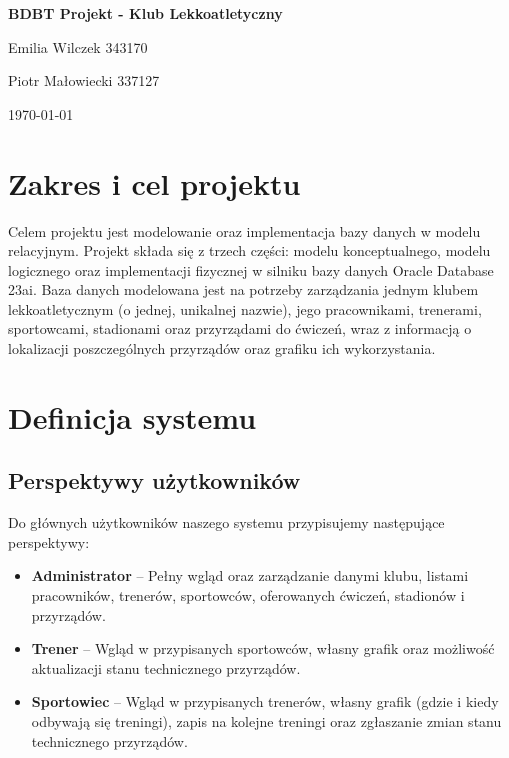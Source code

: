 \documentclass[11pt,a4paper]{article}
\newcommand{\tytulprojektu}{BDBT Projekt - Klub Lekkoatletyczny}
\newcommand{\autorzy}{Emilia Wilczek 343170\par Piotr Małowiecki 337127}
\newcommand{\dataoddania}{\today}
\begin{document}
\begin{titlepage}
    \centering

    {\LARGE\bfseries \tytulprojektu\par}
    \vspace{0.6cm}
    {\large \autorzy\par}

    \vspace{1.5cm}
    {\large \dataoddania\par}
    \vspace*{1cm}
\end{titlepage}

\tableofcontents
\clearpage

\section{Zakres i cel projektu}
Celem projektu jest modelowanie oraz implementacja bazy danych w modelu relacyjnym. Projekt składa
się z trzech części: modelu konceptualnego, modelu logicznego oraz implementacji fizycznej w
silniku bazy danych Oracle Database 23ai. Baza danych modelowana jest na potrzeby zarządzania
jednym klubem lekkoatletycznym (o jednej, unikalnej nazwie), jego pracownikami, trenerami,
sportowcami, stadionami oraz przyrządami do ćwiczeń, wraz z informacją o lokalizacji poszczególnych
przyrządów oraz grafiku ich wykorzystania.

\section{Definicja systemu}

\subsection{Perspektywy użytkowników}
Do głównych użytkowników naszego systemu przypisujemy następujące perspektywy:
\begin{itemize}
    \item \textbf{Administrator} -- Pełny wgląd oraz zarządzanie danymi klubu, listami pracowników, trenerów, sportowców, oferowanych ćwiczeń, stadionów i przyrządów.
    \item \textbf{Trener} -- Wgląd w przypisanych sportowców, własny grafik oraz możliwość aktualizacji stanu technicznego przyrządów.
    \item \textbf{Sportowiec} -- Wgląd w przypisanych trenerów, własny grafik (gdzie i kiedy odbywają się treningi), zapis na kolejne treningi oraz zgłaszanie zmian stanu technicznego przyrządów.
\end{itemize}
\end{document}
